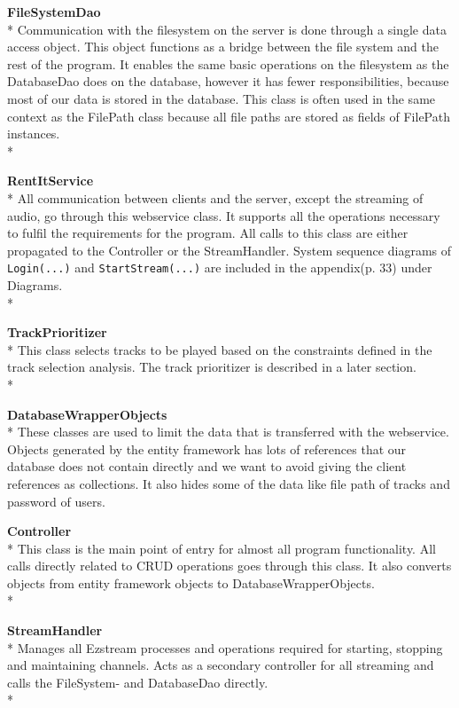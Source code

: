 \documentclass[a4paper,11pt,report]{article}
\begin{document}
\textbf{FileSystemDao} \\*
Communication with the filesystem on the server is done through a single data access object. This object functions as a bridge between the file system and the rest of the program. It enables the same basic operations on the filesystem as the DatabaseDao does on the database, however it has fewer responsibilities, because most of our data is stored in the database. This class is often used in the same context as the FilePath class because all file paths are stored as fields of FilePath instances. \\*

\textbf{RentItService} \\*
All communication between clients and the server, except the streaming of audio, go through this webservice class. It supports all the operations necessary to fulfil the requirements for the program. All calls to this class are either propagated to the Controller or the StreamHandler. System sequence diagrams of \texttt{Login(...)} and \texttt{StartStream(...)} are included in the appendix(p. 33) under Diagrams. \\*

\textbf{TrackPrioritizer} \\*
This class selects tracks to be played based on the constraints defined in the track selection analysis. The track prioritizer is described in a later section. \\*

\textbf{DatabaseWrapperObjects} \\*
These classes are used to limit the data that is transferred with the webservice. Objects generated by the entity framework has lots of references that our database does not contain directly and we want to avoid giving the client references as collections. It also hides some of the data like file path of tracks and password of users.

\textbf{Controller} \\*
This class is the main point of entry for almost all program functionality. All calls directly related to CRUD operations goes through this class. It also converts objects from entity framework objects to DatabaseWrapperObjects.\\*

\textbf{StreamHandler} \\*
Manages all Ezstream processes and operations required for starting, stopping and maintaining channels. Acts as a secondary controller for all streaming and calls the FileSystem- and DatabaseDao directly. \\*
\end{document}

